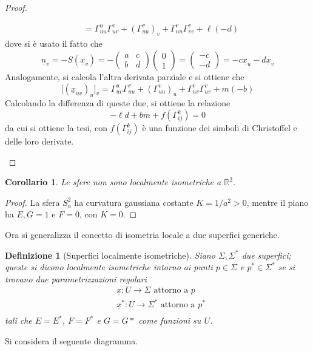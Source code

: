 \documentclass[12pt]{scrartcl}
\theoremstyle{style}
\newtheorem{definizione}{Definizione}[section]
\newtheorem{corollario}{Corollario}[teorema]
\numberwithin{equation}{subsection}
\begin{document}
\begin{proof}
\begin{enumerate}[(1).]
\[\begin{split}
								    &=\Gamma^u_{uu} \Gamma^v_{uv} + (\Gamma^v_{uu} )_v + \Gamma_{uu} ^v \Gamma^v_{vv}  + \ell (-d)
			\end{split}
			\] 
			dove si \`e usato il fatto che 
			\[
				\underline{n}_v = - S(\underline{x}_v) = - \begin{pmatrix} a & c \\ b &d \end{pmatrix} \begin{pmatrix} 0\\1 \end{pmatrix}  = \begin{pmatrix} -c \\ - d \end{pmatrix} = - c\underline{x}_u - d\underline{x}_v
			\] 
		Analogamente, si calcola l'altra derivata parziale e si ottiene che
		\[
			\big[(\underline{x}_{uv} )_u\big]_v = \Gamma^u_{uv} \Gamma^v_{uu} +(\Gamma^v_{uu} )_u + \Gamma^{v} _{uv} \Gamma^v _{uv} + m(-b)
		\] 
	Calcolando la differenza di queste due, si ottiene la relazione
	\[
	- \ell d + bm + f (\Gamma_{ij} ^k) = 0 
	\] 
	da cui si ottiene la tesi, con $f(\Gamma_{ij} ^k)$ \`e una funzione dei simboli di Christoffel e delle loro derivate.
		\end{enumerate}
	\end{proof}
\begin{corollario}
	Le sfere non sono localmente isometriche a $\mathbb{R}^2$.
\end{corollario}
	\begin{proof}
		La sfera $S^2_a$ ha curvatura gaussiana costante $K = 1 / a^2  > 0$, mentre il piano ha $E,G = 1$ e $F = 0$, con $K = 0$.
	\end{proof}
\noindent Ora si generalizza il concetto di isometria locale a due superfici generiche.
\begin{definizione}
	[Superfici localmente isometriche]
	Siano $\Sigma, \Sigma ^*$ due superfici; queste si dicono \textit{localmente isometriche} intorno ai punti $p \in \Sigma$ e $p^* \in \Sigma^*$ se si trovano due parametrizzazioni regolari
	\[
	\begin{split}
		&\underline{x}:U\to \Sigma \text{ attorno a } p\\
		&\underline{x}^*:U\to \Sigma ^* \text{ attorno a } p^*\\
	\end{split}
	\] 
	tali che $E = E^*$, $F = F^*$ e $G = G*$ come funzioni su $U$.
\end{definizione}
\noindent Si considera il seguente diagramma.
\end{document}
